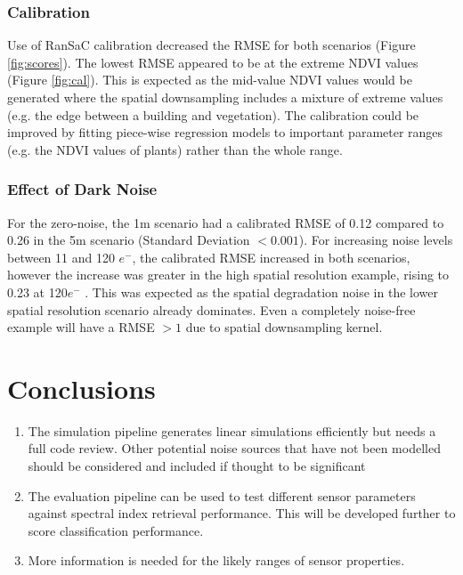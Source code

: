 \documentclass[10pt,a4paper,final,twocolumn]{article}
\begin{document}
\subsubsection{Calibration}
Use of RanSaC calibration decreased the RMSE for both scenarios (Figure \ref{fig:scores}). The lowest RMSE appeared to be at the extreme NDVI values (Figure \ref{fig:cal}). This is expected as the mid-value NDVI values would be generated where the spatial downsampling includes a mixture of extreme values (e.g. the edge between a building and vegetation). The calibration could be improved by fitting piece-wise regression models to important parameter ranges (e.g. the NDVI values of plants) rather than the whole range.

\subsubsection{Effect of Dark Noise}
For the zero-noise, the 1m scenario had a calibrated RMSE of 0.12 compared to 0.26 in the 5m scenario (Standard Deviation $<0.001$). For increasing noise levels between 11 and 120 $e^-$, the calibrated RMSE increased in both scenarios, however the increase was greater in the high spatial resolution example, rising to 0.23 at 120$e^-$ . This was expected as the spatial degradation noise in the lower spatial resolution scenario already dominates. Even a completely noise-free example will have a RMSE $>1$ due to spatial downsampling kernel.

\begin{figure*}
\caption{Uncalibrated (red points) and calibrated (black) simulated v. reference values with regression lines showing model fits. Panels show different noise levels}
\label{fig:cal}
\end{figure*}

\section{Conclusions}
\begin{enumerate}
\item The simulation pipeline generates linear simulations efficiently but needs a full code review. Other potential noise sources that have not been modelled should be considered and included if thought to be significant
\item The evaluation pipeline can be used to test different sensor parameters against spectral index retrieval performance. This will be developed further to score classification performance.
\item More information is needed for the likely ranges of sensor properties.
\end{enumerate}


\end{document}
